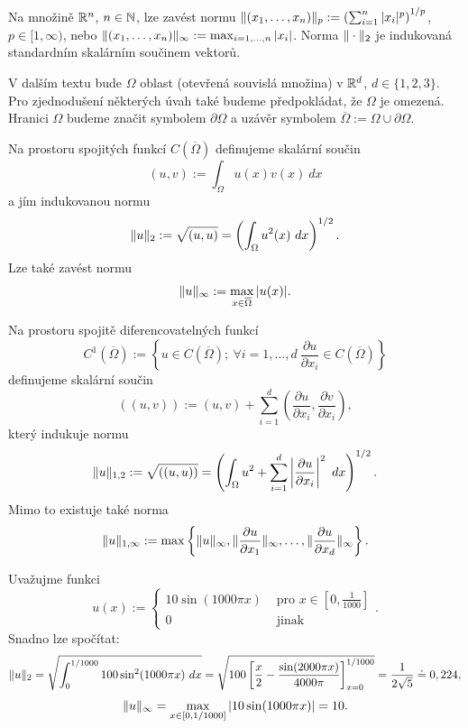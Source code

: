 \begin{ex}
Na množině $\mathbb R^n$, $n\in\mathbb N$, lze zavést normu $\|(x_1,\ldots,x_n)\|_p:=\left(\sum_{i=1}^n|x_i|^p\right)^{1/p}$, $p\in[1,\infty)$, nebo $\|(x_1,\ldots,x_n)\|_\infty:=\max_{i=1,\ldots,n}|x_i|$. Norma $\|\cdot\|_2$ je indukovaná standardním skalárním součinem vektorů.
\end{ex}

V dalším textu bude $\Omega$ oblast (otevřená souvislá množina) v $\mathbb R^d$, $d\in\{1,2,3\}$.
Pro zjednodušení některých úvah také budeme předpokládat, že $\Omega$ je omezená.
Hranici $\Omega$ budeme značit symbolem $\partial\Omega$ a uzávěr symbolem $\overline\Omega:=\Omega\cup\partial\Omega$.

\begin{ex}
Na prostoru spojitých funkcí $C(\overline\Omega)$ definujeme skalární součin
\[ (u,v):=\int_\Omega u(x) v(x)~dx \]
a jím indukovanou normu
\[ \|u\|_2 := \sqrt{(u,u)} = \left(\int_\Omega u^2(x)~dx\right)^{1/2}. \]
Lze také zavést normu
\[ \|u\|_\infty := \max_{x\in\overline\Omega}|u(x)|. \]
\end{ex}

\begin{ex}
Na prostoru spojitě diferencovatelných funkcí
\[ C^1(\overline\Omega):=\left\{u\in C(\overline\Omega);~\forall i=1,\ldots,d~\frac{\partial u}{\partial x_i}\in C(\overline\Omega)\right\} \]
definujeme skalární součin
\[ ((u,v)) := (u,v) + \sum_{i=1}^d(\frac{\partial u}{\partial x_i},\frac{\partial v}{\partial x_i}), \]
který indukuje normu
\[ \|u\|_{1,2} := \sqrt{((u,u))} = \left(\int_\Omega u^2 + \sum_{i=1}^d\left|\frac{\partial u}{\partial x_i}\right|^2~dx\right)^{1/2}. \]
Mimo to existuje také norma
\[ \|u\|_{1,\infty} := \max\left\{\|u\|_{\infty},\|\frac{\partial u}{\partial x_1}\|_{\infty},\dots,\|\frac{\partial u}{\partial x_d}\|_\infty\right\}. \]
\end{ex}

\begin{ex}
Uvažujme funkci
\[ u(x):=\begin{cases}10\sin(1000\pi x) & \mbox{ pro }x\in[0,\frac1{1000}]\\0 & \mbox{ jinak}\end{cases}. \]
Snadno lze spočítat:
\[
\|u\|_2 = \sqrt{\int_0^{1/1000}100\sin^2(1000\pi x)~dx}
= \sqrt{100\left[\frac{x}2-\frac{\sin(2000\pi x)}{4000\pi}\right]_{x=0}^{1/1000}}
= \frac1{2\sqrt{5}}\doteq 0,224,
\]
\[ \|u\|_\infty = \max_{x\in[0,1/1000]}|10\sin(1000\pi x)| = 10. \]
\end{ex}

